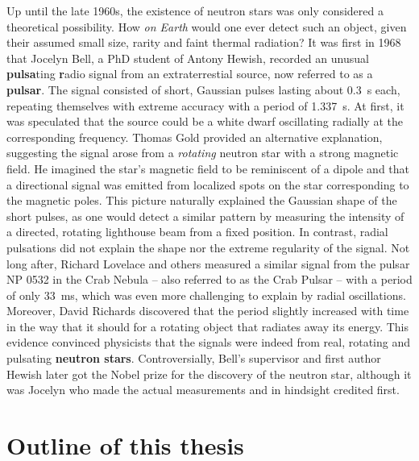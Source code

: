 Up until the late 1960s, the existence of neutron stars was only considered a theoretical possibility.
How \emph{on Earth} would one ever detect such an object, given their assumed small size, rarity and faint thermal radiation?
It was first in 1968 that Jocelyn Bell, a PhD student of Antony Hewish, recorded an unusual \textbf{pulsa}ting \textbf{r}adio signal from an extraterrestial source, now referred to as a \textbf{pulsar}. \cite{ref:neutron_star_discovery_first}
The signal consisted of short, Gaussian pulses lasting about \SI{0.3}{\second} each, repeating themselves with extreme accuracy with a period of \SI{1.337}{\second}. 
At first, it was speculated that the source could be a white dwarf oscillating radially at the corresponding frequency.
Thomas Gold provided an alternative explanation, suggesting the signal arose from a \emph{rotating} neutron star with a strong magnetic field. \cite{ref:neutron_star_gold}
He imagined the star's magnetic field to be reminiscent of a dipole and that a directional signal was emitted from localized spots on the star corresponding to the magnetic poles.
This picture naturally explained the Gaussian shape of the short pulses, as one would detect a similar pattern by measuring the intensity of a directed, rotating lighthouse beam from a fixed position.
In contrast, radial pulsations did not explain the shape nor the extreme regularity of the signal.
Not long after, Richard Lovelace and others measured a similar signal from the pulsar NP 0532 in the Crab Nebula -- also referred to as the Crab Pulsar -- with a period of only \SI{33}{\milli\second}, which was even more challenging to explain by radial oscillations. \cite{ref:crab_pulsar_period_discovery}
Moreover, David Richards discovered that the period slightly increased with time in the way that it should for a rotating object that radiates away its energy.
This evidence convinced physicists that the signals were indeed from real, rotating and pulsating \textbf{neutron stars}.
Controversially, Bell's supervisor and first author Hewish later got the Nobel prize for the discovery of the neutron star, although it was Jocelyn who made the actual measurements and in hindsight credited first.



\section{Outline of this thesis}

